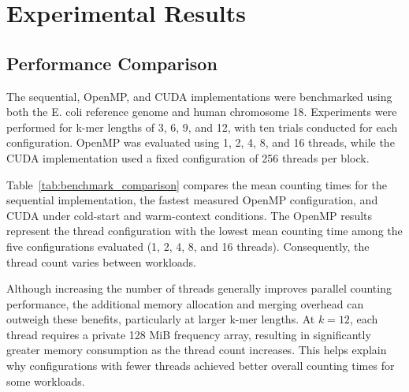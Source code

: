 \documentclass{article}
\begin{document}
\vspace{\baselineskip}

\section{Experimental Results}

\vspace{\baselineskip}

\subsection{Performance Comparison}

\vspace{\baselineskip}

The sequential, OpenMP, and CUDA implementations were benchmarked using both the E. coli reference
genome and human chromosome 18. Experiments were performed for k-mer lengths of 3, 6, 9, and 12,
with ten trials conducted for each configuration. OpenMP was evaluated using 1, 2, 4, 8, and 16
threads, while the CUDA implementation used a fixed configuration of 256 threads per block.

\vspace{\baselineskip}

Table~\ref{tab:benchmark_comparison} compares the mean counting times for the sequential implementation, the 
fastest measured OpenMP configuration, and CUDA under cold-start and warm-context conditions. The OpenMP 
results represent the thread configuration with the lowest mean counting time among the five configurations 
evaluated (1, 2, 4, 8, and 16 threads). Consequently, the thread count varies between workloads. 

\vspace{\baselineskip}

\FloatBarrier



\FloatBarrier

\vspace{\baselineskip}

Although increasing the number of threads generally improves parallel counting performance, the additional 
memory allocation and merging overhead can outweigh these benefits, particularly at larger k-mer lengths. At 
$k=12$, each thread requires a private 128 MiB frequency array, resulting in significantly greater memory consumption 
as the thread count increases. This helps explain why configurations with fewer threads achieved better overall counting 
times for some workloads.
\end{document}
